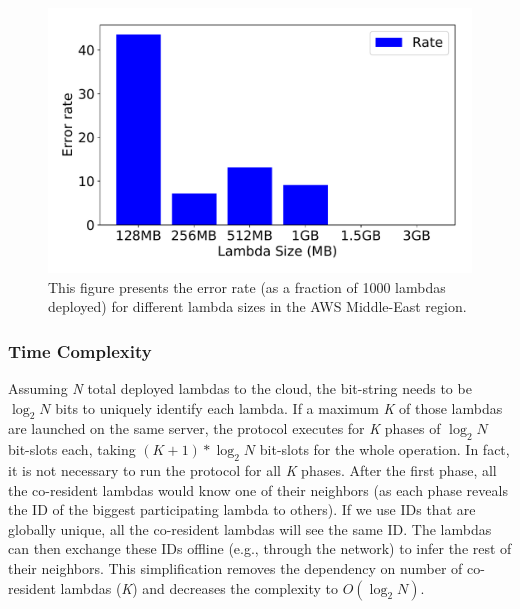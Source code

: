 \begin{figure}[!t]
  \includegraphics[width=.99\linewidth]{fig/errorrates.pdf}
  \caption{This figure presents the error rate (as a fraction of 1000 lambdas
  deployed) for different lambda sizes in the AWS Middle-East region.
\label{fig:errorrates}}
\end{figure}

\subsubsection{Time Complexity}
\label{sec:protocol:complexity}
Assuming \textit{N} total deployed lambdas to the cloud, the bit-string needs
to be $\log_2N$ bits to uniquely identify each lambda. If a maximum \textit{K}
of those lambdas are launched on the same server, the protocol executes for
\textit{K} phases of $\log_2N$ bit-slots each, taking $(K+1)*\log_2N$ bit-slots
for the whole operation.  In fact, it is not necessary to run the protocol for all \textit{K}
phases. After the first phase, all the co-resident lambdas would know one of
their neighbors (as each phase reveals the ID of the biggest participating
lambda to others).  If we use IDs that are globally unique, all the
co-resident lambdas will see the same ID. The lambdas can then exchange these IDs
offline (e.g., through the network) to infer the rest of their neighbors. This
simplification removes the dependency on number of co-resident lambdas
(\textit{K}) and decreases the complexity to $O(\log_2N)$.




